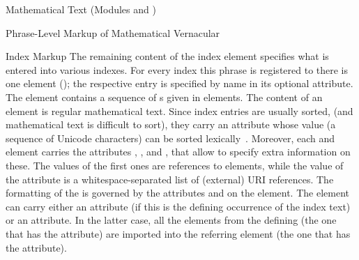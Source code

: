 \begin{tchapter}[id=mtxt,short=Mathematical Text]{Mathematical Text (Modules
   and )}
\begin{tsection}[id=phrases]{Phrase-Level Markup of Mathematical Vernacular}
\begin{tsubsection}{Index Markup}
The remaining content of the index element specifies what is entered into various
indexes. For every index this phrase is registered to there is one  element
(); the respective entry is specified by name in its optional
 attribute. The  element contains a sequence of
s given in {} elements. The content of an
 element is regular mathematical text. Since index entries are usually
sorted, (and mathematical text is difficult to sort), they carry an attribute
 whose value (a sequence of Unicode characters) can be sorted
lexically~\cite{Unicode:collation}. Moreover, each  and 
element carries the attributes , ,
and , that allow to specify extra information on these. The
values of the first ones are references to  elements, while the value of
the  attribute is a whitespace-separated list of (external) URI
references.  The formatting of the  is governed by the attributes
 and  on the  element. The
 element can carry either an  attribute
(if this is the defining occurrence of the index text) or an 
attribute. In the latter case, all the  elements from the defining
 (the one that has the  attribute) are
imported into the referring  element (the one that has the
 attribute).
\end{tsubsection}


\end{tsection}
\end{tchapter}
